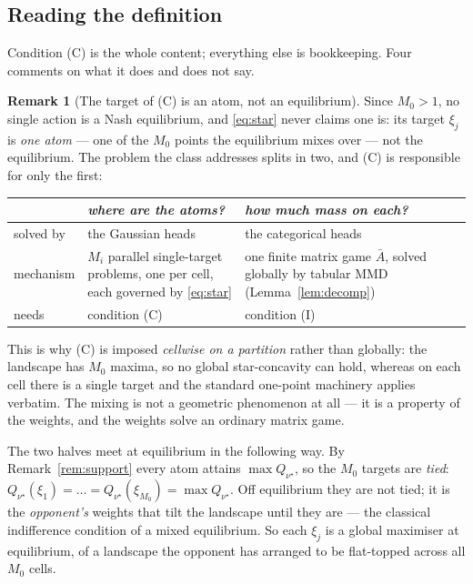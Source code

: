 \documentclass[11pt]{article}
\theoremstyle{definition}
\newtheorem{remark}{Remark}
\begin{document}
\subsection{Reading the definition}

Condition (C) is the whole content; everything else is bookkeeping. Four
comments on what it does and does not say.

\begin{remark}[The target of (C) is an atom, not an equilibrium]
\label{rem:atomnotnash}
Since $M_0 > 1$, no single action is a Nash equilibrium, and \eqref{eq:star}
never claims one is: its target $\xi_j$ is \emph{one atom} --- one of the $M_0$
points the equilibrium mixes over --- not the equilibrium. The problem the class
addresses splits in two, and (C) is responsible for only the first:
\begin{center}
\begin{tabular}{@{}l p{} p{}@{}}
\hline
& \emph{where are the atoms?} & \emph{how much mass on each?}\\
\hline
solved by & the Gaussian heads & the categorical heads\\
mechanism & $M_i$ parallel single-target problems, one per cell, each governed
  by \eqref{eq:star} & one finite matrix game $\bar A$, solved globally by
  tabular MMD (Lemma~\ref{lem:decomp})\\
needs & condition (C) & condition (I)\\
\hline
\end{tabular}
\end{center}
This is why (C) is imposed \emph{cellwise on a partition} rather than globally:
the landscape has $M_0$ maxima, so no global star-concavity can hold, whereas on
each cell there is a single target and the standard one-point machinery applies
verbatim. The mixing is not a geometric phenomenon at all --- it is a property of
the weights, and the weights solve an ordinary matrix game.

The two halves meet at equilibrium in the following way. By
Remark~\ref{rem:support} every atom attains $\max Q_{\nu^\star}$, so the $M_0$
targets are \emph{tied}:
$Q_{\nu^\star}(\xi_1) = \dots = Q_{\nu^\star}(\xi_{M_0}) = \max Q_{\nu^\star}$.
Off equilibrium they are not tied; it is the \emph{opponent's} weights that tilt
the landscape until they are --- the classical indifference condition of a mixed
equilibrium. So each $\xi_j$ is a global maximiser at equilibrium, of a landscape
the opponent has arranged to be flat-topped across all $M_0$ cells.


\end{remark}
\end{document}
